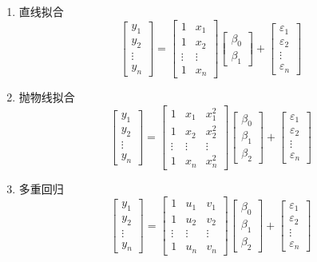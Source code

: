 \documentclass[11pt,UTF8]{ctexart}
\begin{document}
\begin{enumerate}
	\itemsep -3pt
	\item 直线拟合
	\[\begin{bmatrix}y_1\\y_2\\\vdots\\y_n\end{bmatrix}=\begin{bmatrix}1&x_1\\1&x_2\\\vdots&\vdots\\1&x_n\end{bmatrix}\begin{bmatrix}\beta_0\\\beta_1\end{bmatrix}+\begin{bmatrix}\varepsilon_1\\\varepsilon_2\\\vdots\\\varepsilon_n\end{bmatrix}\]
	\item 抛物线拟合
	\[\begin{bmatrix}y_1\\y_2\\\vdots\\y_n\end{bmatrix}=\begin{bmatrix}1&x_1&x_1^2\\1&x_2&x_2^2\\\vdots&\vdots&\vdots\\1&x_n&x_n^2\end{bmatrix}\begin{bmatrix}\beta_0\\\beta_1\\\beta_2\end{bmatrix}+\begin{bmatrix}\varepsilon_1\\\varepsilon_2\\\vdots\\\varepsilon_n\end{bmatrix}\]
	\item 多重回归
	\[\begin{bmatrix}y_1\\y_2\\\vdots\\y_n\end{bmatrix}=\begin{bmatrix}1&u_1&v_1\\1&u_2&v_2\\\vdots&\vdots&\vdots\\1&u_n&v_n\end{bmatrix}\begin{bmatrix}\beta_0\\\beta_1\\\beta_2\end{bmatrix}+\begin{bmatrix}\varepsilon_1\\\varepsilon_2\\\vdots\\\varepsilon_n\end{bmatrix}\]
\end{enumerate}
\end{document}
